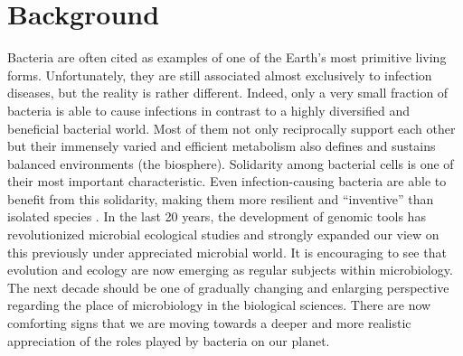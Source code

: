\logvartrue
\chapter{Background}

Bacteria are often cited as examples of one of the Earth's most primitive living forms. Unfortunately, they are still associated almost exclusively to infection diseases, but the reality is rather different. Indeed, only a very small fraction of bacteria is able to cause infections in contrast to a highly diversified and beneficial bacterial world. Most of them not only reciprocally support each other but their immensely varied and efficient metabolism also defines and sustains balanced environments (the biosphere). Solidarity among bacterial cells is one of their most important characteristic. Even infection-causing bacteria are able to benefit from this solidarity, making them more resilient and ``inventive'' than isolated species \cite{mathieu1995powerful}. In the last 20 years, the development of genomic tools has revolutionized microbial ecological studies and strongly expanded our view on this previously under appreciated microbial world. It is encouraging to see that evolution and ecology are now emerging as regular subjects within microbiology. The next decade should be one of gradually changing and enlarging perspective regarding the place of microbiology in the biological sciences. There are now comforting signs that we are moving towards a deeper and more realistic appreciation of the roles played by bacteria on our planet.

